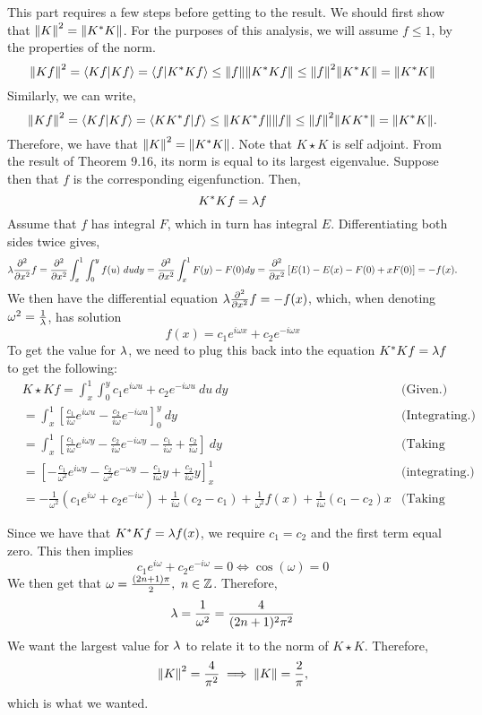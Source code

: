 \begin{solution}

    This part requires a few steps before getting to the result. We should first show that $\norm{K}^2 = \norm{K^{*} K}$. For the purposes of this analysis, we will assume $f \leq 1$, by the properties of the norm.  
    \[\norm{Kf}^2 = \braket{Kf}{Kf} = \braket{f}{K^{*} K f} \leq \norm{f}\norm{K^{*} K f} \leq \norm{f}^2\norm{K^{*} K} = \norm{K^{*} K}\]
    Similarly, we can write,
    \[\norm{Kf}^2 = \braket{Kf}{Kf} = \braket{KK^{*} f}{ f} \leq \norm{KK^{*} f}\norm{f} \leq \norm{f}^2\norm{KK^{*}} = \norm{K^{*} K}.\]
    Therefore, we have that $\norm{K}^2 = \norm{K^{*} K}$. Note that $K\star K$ is self adjoint. From the result of Theorem 9.16, its norm is equal to its largest eigenvalue. Suppose then that $f$ is the corresponding eigenfunction. Then,
    \[K^{*} K f = \mathrm{\lambda} f\]
    Assume that $f$ has integral $F$, which in turn has integral $E$. Differentiating both sides twice gives,
    \[\mathrm{\lambda}\frac{\partial^2}{\partial x^2} f = \frac{\partial^2}{\partial x^2} \int_x^1\int_0^y f(u) \ du  dy = \frac{\partial^2}{\partial x^2} \int_x^1F(y) - F(0)  dy = \frac{\partial^2}{\partial x^2}\left[E(1) - E(x) - F(0) + xF(0)\right] = -f(x).\]
    We then have the differential equation $\mathrm{\lambda} \frac{\partial^2}{\partial x^2} f = -f(x)$, which, when denoting $\omega^2 = \frac{1}{\mathrm{\lambda}}$, has solution
    \[f(x) = c_1e^{i\omega x} + c_2e^{-i\omega x}\]
    To get the value for $\mathrm{\lambda}$, we need to plug this back into the equation $K^{*} K f = \mathrm{\lambda} f$ to get the following:
    \tightalignbreak
    \begin{align*}
        &K\star K f = \int_x^1\int_0^y c_1e^{i\omega u} + c_2 e^{-i\omega u} \ du \ dy &\text{(Given.)}\\
        &= \int_x^1 \left[ \frac{c_1}{i\omega}e^{i\omega u} - \frac{c_2}{i\omega}e^{-i\omega u}\right]_0^y \ dy &\text{(Integrating.)}\\
        &= \int_x^1 \left[\frac{c_1}{i\omega}e^{i\omega y} - \frac{c_2}{i\omega}e^{-i\omega y} - \frac{c_1}{i\omega} + \frac{c_2}{i\omega} \right] \ dy &\text{(Taking limits.)}\\
        &= \left[-\frac{c_1}{\omega^2}e^{i\omega y} - \frac{c_2}{\omega^2}e^{-\omega y} - \frac{c_1}{i\omega}y + \frac{c_2}{i\omega}y\right]_x^1 &\text{(integrating.)}\\
        &= -\frac{1}{\omega^2}(c_1e^{i\omega} + c_2e^{-i\omega}) + \frac{1}{i\omega}(c_2 - c_1) + \frac{1}{\omega^2}f(x) + \frac{1}{i\omega}(c_1 - c_2)x &\text{(Taking bounds.)}
    \end{align*}
    \vspace{-12mm}\alignbreak

    Since we have that $K^{*} Kf = \mathrm{\lambda} f(x)$, we require $c_1 = c_2$ and the first term equal zero. This then implies 
    \[c_1e^{i\omega} + c_2e^{-i\omega} = 0 \iff \cos(\omega) = 0\]
    We then get that $\omega = \frac{(2n+1)\pi}{2}, \ n \in \mathbb{Z}$. Therefore, 
    \[\mathrm{\lambda} = \frac{1}{\omega^2} = \frac{4}{(2n+1)^2\pi^2}\]
    We want the largest value for $\mathrm{\lambda}$ to relate it to the norm of $K\star K$. Therefore, 
    \[\norm{K}^2 = \frac{4}{\pi^2} \implies \norm{K} = \frac{2}{\pi},\]
    which is what we wanted.
\end{solution}


